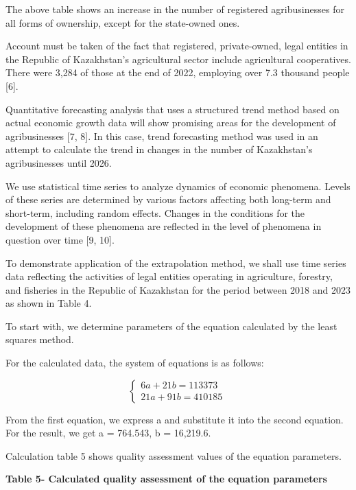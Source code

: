 The above table shows an increase in the number of registered
agribusinesses for all forms of ownership, except for the state-owned
ones.

Account must be taken of the fact that registered, private-owned, legal
entities in the Republic of Kazakhstan's agricultural sector include
agricultural cooperatives. There were 3,284 of those at the end of 2022,
employing over 7.3 thousand people {[}6{]}.

Quantitative forecasting analysis that uses a structured trend method
based on actual economic growth data will show promising areas for the
development of agribusinesses {[}7, 8{]}. In this case, trend
forecasting method was used in an attempt to calculate the trend in
changes in the number of Kazakhstan's agribusinesses until 2026.

We use statistical time series to analyze dynamics of economic
phenomena. Levels of these series are determined by various factors
affecting both long-term and short-term, including random effects.
Changes in the conditions for the development of these phenomena are
reflected in the level of phenomena in question over time {[}9, 10{]}.

To demonstrate application of the extrapolation method, we shall use
time series data reflecting the activities of legal entities operating
in agriculture, forestry, and fisheries in the Republic of Kazakhstan
for the period between 2018 and 2023 as shown in Table 4.

To start with, we determine parameters of the equation calculated by the
least squares method.

For the calculated data, the system of equations is as follows:

\[\left\{ \begin{array}{r}
6a + 21b = 113373 \\
21a + 91b = 410185
\end{array} \right.\ \]

From the first equation, we express a and substitute it into the second
equation. For the result, we get a = 764.543, b = 16,219.6.

Calculation table 5 shows quality assessment values of the equation
parameters.

{\bfseries Table 5- Calculated quality assessment of the equation
parameters}

